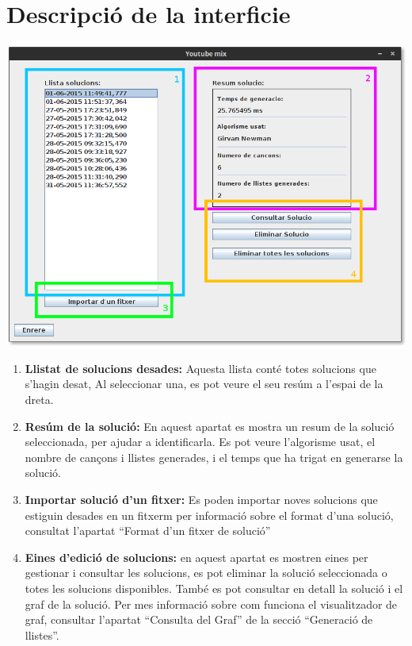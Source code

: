\documentclass[letterpaper,10pt,oneside]{sphinxmanual}
\begin{document}
\section{Descripció de la interficie}
\label{consult_hist:descripcio-de-la-interficie}
\includegraphics{consult_sol.png}
\begin{enumerate}
\item {} 
\textbf{Llistat de solucions desades:} Aquesta llista conté totes solucions que s'hagin desat, Al seleccionar una, es pot veure el seu resúm a l'espai de la dreta.

\item {} 
\textbf{Resúm de la solució:} En aquest apartat es mostra un resum de la solució seleccionada, per ajudar a identificarla. Es pot veure l'algorisme usat, el nombre de cançons i llistes generades, i el temps que ha trigat en generarse la solució.

\item {} 
\textbf{Importar solució d'un fitxer:} Es poden importar noves solucions que estiguin desades en un fitxerm per informació sobre el format d'una solució, consultat l'apartat ``Format d'un fitxer de solució''

\item {} 
\textbf{Eines d'edició de solucions:} en aquest apartat es mostren eines per gestionar i consultar les solucions, es pot eliminar la solució seleccionada o totes les solucions disponibles. També es pot consultar en detall la solució i el graf de la solució. Per mes informació sobre com funciona el visualitzador de graf, consultar l'apartat ``Consulta del Graf'' de la secció ``Generació de llistes''.

\end{enumerate}
\end{document}
